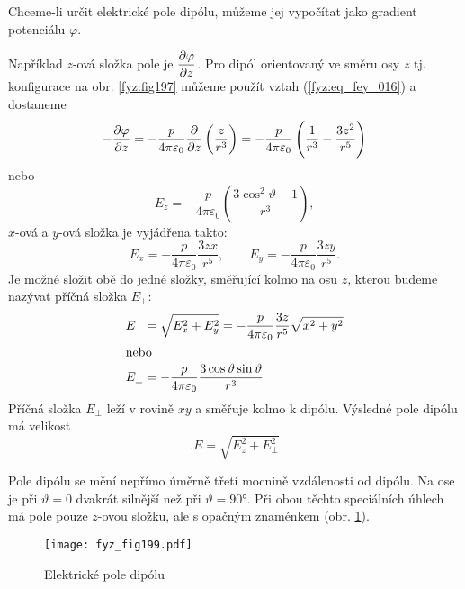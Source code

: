 {  Chceme-li určit elektrické pole dipólu, můžeme jej vypočítat jako gradient potenciálu 
  \(\varphi\).

  Například \(z\)-ová složka pole je \(\dfrac{\partial \varphi}{\partial z}\). Pro dipól orientovaný ve směru osy 
  \(z\) tj. konfigurace na obr. \ref{fyz:fig197} můžeme použít vztah (\ref{fyz:eq_fey_016}) a 
  dostaneme      
  \begin{equation}\label{fyz:eq_fey_021}
  -\dfrac{\partial \varphi}{\partial z}
     = - \frac{p}{4\pi\varepsilon_0}\dfrac{\partial }{\partial z}\left(\dfrac{z}{r^3}\right)
     = - \frac{p}{4\pi\varepsilon_0}\left(\frac{1}{r^3}-\dfrac{3z^2}{r^5}\right) 
  \end{equation}
  nebo
  \begin{equation}\label{fyz:eq_fey_022}
    E_z = - \frac{p}{4\pi\varepsilon_0}\left(\dfrac{3\cos^2\vartheta-1}{r^3}\right),
  \end{equation}
  \(x\)-ová a \(y\)-ová složka je vyjádřena takto:
  \begin{equation}\label{fyz:eq_fey_023}
    E_x = - \frac{p}{4\pi\varepsilon_0}\dfrac{3zx}{r^5}, \qquad
    E_y = - \frac{p}{4\pi\varepsilon_0}\dfrac{3zy}{r^5}.
  \end{equation}
  Je možné složit obě do jedné složky, směřující kolmo na osu \(z\), kterou budeme nazývat 
  příčná složka \(E_\perp\):
  \begin{align}
    E_\perp &= \sqrt{E_x^2 + E_y^2} 
             = - \frac{p}{4\pi\varepsilon_0}\dfrac{3z}{r^5}\sqrt{x^2+y^2} \nonumber \\
    \shortintertext{nebo}
    E_\perp &= - \frac{p}{4\pi\varepsilon_0}\dfrac{3\cos\vartheta\sin\vartheta}{r^3} 
                                                                         \label{fyz:eq_fey_024}
  \end{align}
  Příčná složka \(E_\perp\) leží v rovině \(xy\) a směřuje kolmo k dipólu. Výsledné pole dipólu 
  má velikost
  \begin{equation}\label{fyz:eq_fey_025}.
    E = \sqrt{E_z^2 + E_\perp^2} 
  \end{equation}
  
  Pole dipólu se mění nepřímo úměrně třetí mocnině vzdálenosti od dipólu. Na ose je při 
  \(\vartheta= 0\) dvakrát silnější než při \(\vartheta=\ang{90}\). Při obou těchto 
  speciálních úhlech má pole pouze \(z\)-ovou složku, ale s opačným znaménkem (obr. 
  \ref{fyz:fig199}).
  \begin{figure}[ht!]
    \centering
    \texttt{[image: fyz\_fig199.pdf]}
    \caption{Elektrické pole dipólu}
    \label{fyz:fig199}
  \end{figure}

}
